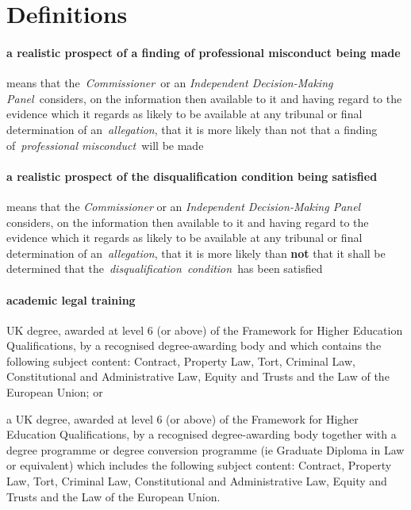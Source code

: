 \part{Definitions}


   \subsection{a realistic prospect of a finding of professional misconduct
  being made} means that the~\emph{Commissioner~}or
  an \emph{Independent Decision-Making Panel~}considers, on the
  information then available to it and having regard to the evidence
  which it regards as likely to be available at any tribunal or final
  determination of an~\emph{allegation}, that it is more likely than not
  that a finding of~\emph{professional misconduct~}will be made  \subsection{a realistic prospect of the disqualification condition being
  satisfied } means that the \emph{Commissioner} or an \emph{Independent
  Decision-Making Panel} considers, on the information then available to
  it and having regard to the evidence which it regards as likely to be
  available at any tribunal or final determination of
  an~\emph{allegation}, that it is more likely than \textbf{not} that it shall be
  determined that the~\emph{disqualification~condition~}has been
  satisfied  \subsection{academic legal training }
\al \item UK degree, awarded at level 6
  (or above) of the Framework for Higher Education Qualifications, by a
  recognised degree-awarding body and which contains the following
  subject content: Contract, Property Law, Tort, Criminal Law,
  Constitutional and Administrative Law, Equity and Trusts and the Law
  of the European Union; or
  \item a UK degree, awarded at level 6 (or
  above) of the Framework for Higher Education Qualifications, by a
  recognised degree-awarding body together with a degree programme or
  degree conversion programme (ie Graduate Diploma in Law or equivalent)
  which includes the following subject content: Contract, Property Law,
  Tort, Criminal Law, Constitutional and Administrative Law, Equity and
  Trusts and the Law of the European Union. \la
